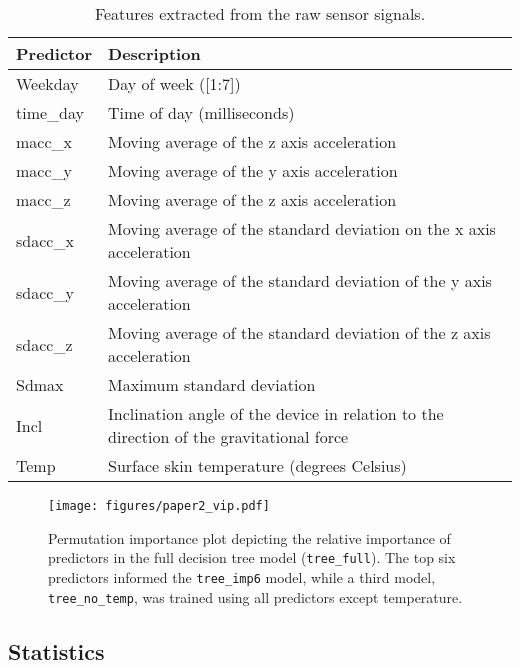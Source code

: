 \documentclass[
  10pt,
]{scrbook}
\begin{document}
\begingroup

\footnotesize

\hypertarget{tbl-8}{}
\begin{longtable}{ll}
\caption{\label{tbl-8}Features extracted from the raw sensor signals. }\tabularnewline

\toprule
Predictor & Description \\ 
\midrule
Weekday & Day of week ([1:7]) \\ 
time\_day & Time of day (milliseconds) \\ 
macc\_x & Moving average of the z axis acceleration \\ 
macc\_y & Moving average of the y axis acceleration \\ 
macc\_z & Moving average of the z axis acceleration \\ 
sdacc\_x & Moving average of the standard deviation on the x axis acceleration \\ 
sdacc\_y & Moving average of the standard deviation of the y axis acceleration \\ 
sdacc\_z & Moving average of the standard deviation of the z axis acceleration \\ 
Sdmax & Maximum standard deviation \\ 
Incl & Inclination angle of the device in relation to the direction of the gravitational force \\ 
Temp & Surface skin temperature (degrees Celsius) \\ 
\bottomrule
\end{longtable}

\endgroup

\begin{figure}

{\centering \texttt{[image: figures/paper2\_vip.pdf]}

}

\caption{\label{fig-importance}Permutation importance plot depicting the
relative importance of predictors in the full decision tree model
(\texttt{tree\_full}). The top six predictors informed the
\texttt{tree\_imp6} model, while a third model, \texttt{tree\_no\_temp},
was trained using all predictors except temperature.}

\end{figure}

\hypertarget{statistics-1}{%
\subsection{Statistics}\label{statistics-1}}
\end{document}
